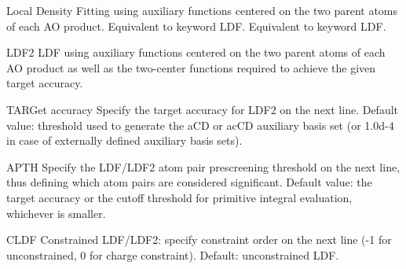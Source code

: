 \begin{keywordlist}
Local Density Fitting using auxiliary functions centered on the two parent atoms of each AO product. Equivalent to keyword LDF.
Equivalent to keyword LDF.
\item[LDF2]
LDF using auxiliary functions centered on the two parent atoms of each AO product as well as the two-center functions required to achieve the given target accuracy.
\item[TARGet accuracy]
Specify the target accuracy for LDF2 on the next line. Default value: threshold used to generate the aCD or acCD auxiliary basis set
(or 1.0d{}-4 in case of externally defined auxiliary basis sets).
\item[APTH]
Specify the LDF/LDF2 atom pair prescreening threshold on the next line, thus defining which atom pairs are considered significant.
Default value: the target accuracy or the cutoff threshold for primitive integral evaluation, whichever is smaller.
\item[CLDF]
Constrained LDF/LDF2: specify constraint order on the next line (-1 for unconstrained, 0 for charge constraint). Default: unconstrained LDF.

\end{keywordlist}
